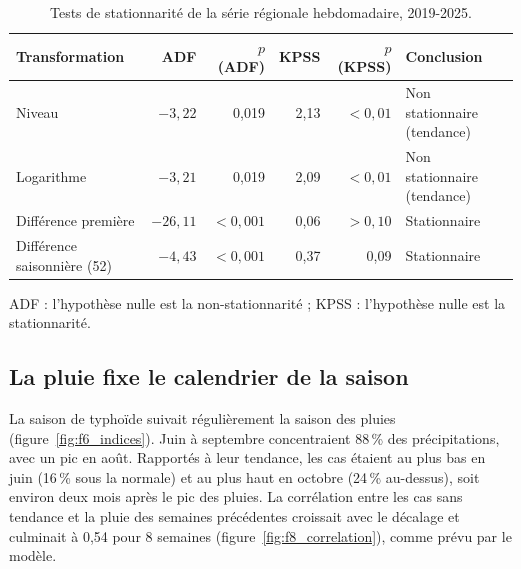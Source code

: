 \documentclass[11pt]{article}
\begin{document}
\begin{table}[!htbp]\centering\small
\caption{Tests de stationnarité de la série régionale hebdomadaire, 2019-2025.}\label{tab:stat}
\begin{tabularx}{\linewidth}{@{}L rrrr L@{}}\toprule
Transformation & ADF & $p$ (ADF) & KPSS & $p$ (KPSS) & Conclusion \\\midrule
Niveau & $-3{,}22$ & 0,019 & 2,13 & $<0{,}01$ & Non stationnaire (tendance) \\
Logarithme & $-3{,}21$ & 0,019 & 2,09 & $<0{,}01$ & Non stationnaire (tendance) \\
Différence première & $-26{,}11$ & $<0{,}001$ & 0,06 & $>0{,}10$ & Stationnaire \\
Différence saisonnière (52) & $-4{,}43$ & $<0{,}001$ & 0,37 & 0,09 & Stationnaire \\\bottomrule
\end{tabularx}
\par\smallskip\raggedright ADF : l'hypothèse nulle est la non-stationnarité ; KPSS : l'hypothèse nulle est la stationnarité.
\end{table}


\subsection{La pluie fixe le calendrier de la saison}
La saison de typhoïde suivait régulièrement la saison des pluies (figure~\ref{fig:f6_indices}). Juin à septembre concentraient 88\,\% des précipitations, avec un pic en août. Rapportés à leur tendance, les cas étaient au plus bas en juin (16\,\% sous la normale) et au plus haut en octobre (24\,\% au-dessus), soit environ deux mois après le pic des pluies. La corrélation entre les cas sans tendance et la pluie des semaines précédentes croissait avec le décalage et culminait à 0,54 pour 8 semaines (figure~\ref{fig:f8_correlation}), comme prévu par le modèle.


\end{document}
